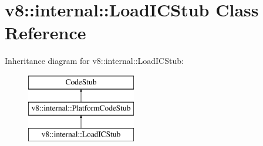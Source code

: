 \hypertarget{classv8_1_1internal_1_1_load_i_c_stub}{}\section{v8\+:\+:internal\+:\+:Load\+I\+C\+Stub Class Reference}
\label{classv8_1_1internal_1_1_load_i_c_stub}
Inheritance diagram for v8\+:\+:internal\+:\+:Load\+I\+C\+Stub\+:\begin{figure}[H]
\begin{center}
\leavevmode
\includegraphics[height=3.000000cm]{classv8_1_1internal_1_1_load_i_c_stub}
\end{center}
\end{figure}
